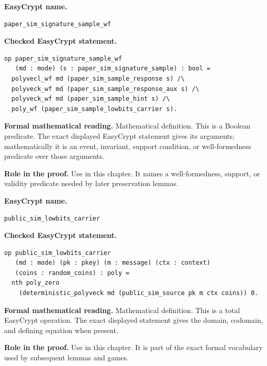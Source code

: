 \begin{formaldefinition}
\noindent\textbf{EasyCrypt name.}
\begin{lstlisting}[language=EasyCrypt,basicstyle=\ttfamily\scriptsize]
paper_sim_signature_sample_wf
\end{lstlisting}
\noindent\textbf{Checked EasyCrypt statement.}
\begin{lstlisting}[language=EasyCrypt,basicstyle=\ttfamily\scriptsize]
op paper_sim_signature_sample_wf
   (md : mode) (s : paper_sim_signature_sample) : bool =
  polyvecl_wf md (paper_sim_sample_response s) /\
  polyveck_wf md (paper_sim_sample_response_aux s) /\
  polyveck_wf md (paper_sim_sample_hint s) /\
  poly_wf (paper_sim_sample_lowbits_carrier s).
\end{lstlisting}
\noindent\textbf{Formal mathematical reading.}
Mathematical definition. This is a Boolean predicate.  The exact displayed EasyCrypt statement gives its arguments; mathematically it is an event, invariant, support condition, or well-formedness predicate over those arguments.

\noindent\textbf{Role in the proof.}
Use in this chapter. It names a well-formedness, support, or validity predicate needed by later preservation lemmas.

\end{formaldefinition}

\begin{formaldefinition}[EasyCrypt line 931]
\noindent\textbf{EasyCrypt name.}
\begin{lstlisting}[language=EasyCrypt,basicstyle=\ttfamily\scriptsize]
public_sim_lowbits_carrier
\end{lstlisting}
\noindent\textbf{Checked EasyCrypt statement.}
\begin{lstlisting}[language=EasyCrypt,basicstyle=\ttfamily\scriptsize]
op public_sim_lowbits_carrier
   (md : mode) (pk : pkey) (m : message) (ctx : context)
   (coins : random_coins) : poly =
  nth poly_zero
    (deterministic_polyveck md (public_sim_source pk m ctx coins)) 0.
\end{lstlisting}
\noindent\textbf{Formal mathematical reading.}
Mathematical definition. This is a total EasyCrypt operation.  The exact displayed statement gives the domain, codomain, and defining equation when present.

\noindent\textbf{Role in the proof.}
Use in this chapter. It is part of the exact formal vocabulary used by subsequent lemmas and games.

\end{formaldefinition}

